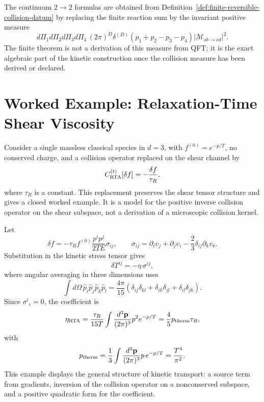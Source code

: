 The continuum \(2\to2\) formulas are obtained from
Definition~\ref{def:finite-reversible-collision-datum} by replacing the
finite reaction sum by the invariant positive measure
\[
  d\Pi_1d\Pi_2d\Pi_3d\Pi_4\,
  (2\pi)^D\delta^{(D)}(p_1+p_2-p_3-p_4)
  |\mathcal M_{ab\to cd}|^2 .
\]
The finite theorem is not a derivation of this measure from QFT; it is the
exact algebraic part of the kinetic construction once the collision measure
has been derived or declared.

\section{Worked Example: Relaxation-Time Shear Viscosity}

\begin{controlledapproximation}
\label{ca:kinetic-constant-relaxation-time}
Consider a single massless classical species in \(d=3\), with
\(f^{(0)}=e^{-p/T}\), no conserved charge, and a collision operator replaced
on the shear channel by
\[
  C^{(t)}_{\rm RTA}[\delta f]=-\frac{\delta f}{\tau_R},
\]
where \(\tau_R\) is a constant.  This replacement preserves the shear
tensor structure and gives a closed worked example.  It is a model for the
positive inverse collision operator on the shear subspace, not a derivation
of a microscopic collision kernel.
\end{controlledapproximation}

Let
\[
  \delta f
  =
  -\tau_R
  f^{(0)}
  \frac{p^ip^j}{2TE}
  \sigma_{ij},
  \qquad
  \sigma_{ij}
  =
  \partial_i v_j+\partial_j v_i
  -\frac23\delta_{ij}\partial_kv_k .
\]
Substitution in the kinetic stress tensor gives
\[
  \delta T^{ij}
  =
  -\eta\,\sigma^{ij},
\]
where angular averaging in three dimensions uses
\[
  \int d\Omega\,\hat p_i\hat p_j\hat p_k\hat p_l
  =
  \frac{4\pi}{15}
  (\delta_{ij}\delta_{kl}+\delta_{ik}\delta_{jl}
  +\delta_{il}\delta_{jk}).
\]
Since \(\sigma^i{}_i=0\), the coefficient is
\begin{equation}
  \eta_{\rm RTA}
  =
  \frac{\tau_R}{15T}
  \int\frac{d^3\mathbf p}{(2\pi)^3}
  p^2e^{-p/T}
  =
  \frac{4}{5}p_{\rm therm}\tau_R,
  \label{eq:kinetic-rta-shear-viscosity}
\end{equation}
with
\[
  p_{\rm therm}
  =
  \frac13\int\frac{d^3\mathbf p}{(2\pi)^3}p\,e^{-p/T}
  =
  \frac{T^4}{\pi^2}.
\]
This example displays the general structure of kinetic transport: a source
term from gradients, inversion of the collision operator on a nonconserved
subspace, and a positive quadratic form for the coefficient.

